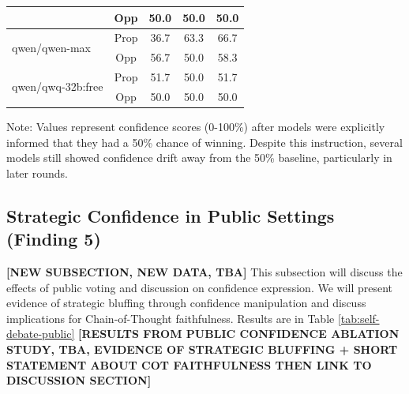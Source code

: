 \documentclass{article}
\begin{document}
\begin{table}[htbp]
\begin{tabular}{l|c|ccc}
       & Opp & 50.0 & 50.0 & 50.0 \\
      \midrule
      \multirow{2}{*}{qwen/qwen-max} & Prop & 36.7 & 63.3 & 66.7 \\
       & Opp & 56.7 & 50.0 & 58.3 \\
      \midrule
      \multirow{2}{*}{qwen/qwq-32b:free} & Prop & 51.7 & 50.0 & 51.7 \\
       & Opp & 50.0 & 50.0 & 50.0 \\
      \bottomrule
  \end{tabular}
  \begin{tablenotes}
    \small
    \item Note: Values represent confidence scores (0-100\%) after models were explicitly informed that they had a 50\% chance of winning. Despite this instruction, several models still showed confidence drift away from the 50\% baseline, particularly in later rounds.
  \end{tablenotes}
\end{table}


\subsection{Strategic Confidence in Public Settings (Finding 5)}
\textbf{[NEW SUBSECTION, NEW DATA, TBA]}
This subsection will discuss the effects of public voting and discussion on confidence expression. We will present evidence of strategic bluffing through confidence manipulation and discuss implications for Chain-of-Thought faithfulness.  Results are in Table \ref{tab:self-debate-public} \textbf{[RESULTS FROM PUBLIC CONFIDENCE ABLATION STUDY, TBA, EVIDENCE OF STRATEGIC BLUFFING + SHORT STATEMENT ABOUT COT FAITHFULNESS THEN LINK TO DISCUSSION SECTION]}
\end{document}
